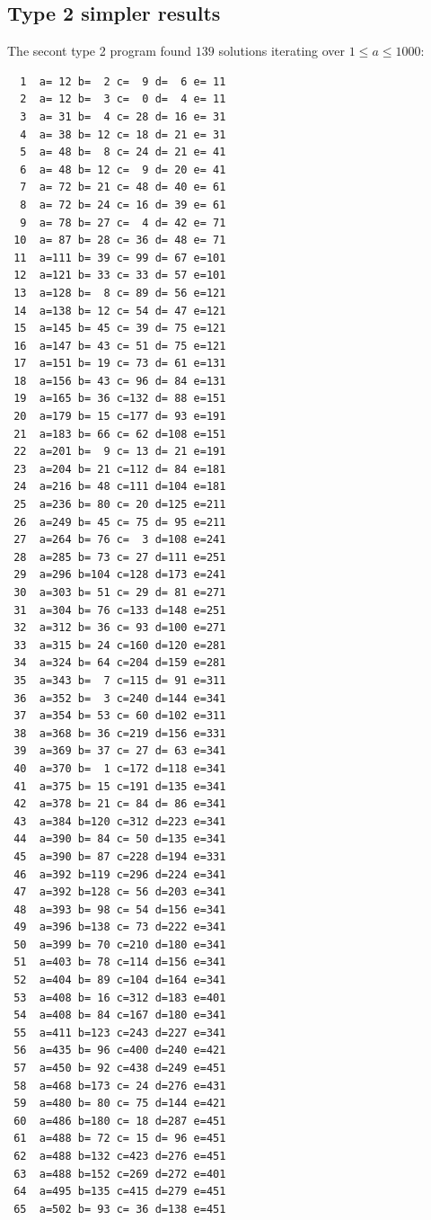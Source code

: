\documentclass[11pt]{article}
\begin{document}
\subsection{Type 2 simpler results}
The secont type 2 program found $139$ solutions iterating over $1 \leq a \leq 1000$: 
\begin{lstlisting}
  1  a= 12 b=  2 c=  9 d=  6 e= 11
  2  a= 12 b=  3 c=  0 d=  4 e= 11
  3  a= 31 b=  4 c= 28 d= 16 e= 31
  4  a= 38 b= 12 c= 18 d= 21 e= 31
  5  a= 48 b=  8 c= 24 d= 21 e= 41
  6  a= 48 b= 12 c=  9 d= 20 e= 41
  7  a= 72 b= 21 c= 48 d= 40 e= 61
  8  a= 72 b= 24 c= 16 d= 39 e= 61
  9  a= 78 b= 27 c=  4 d= 42 e= 71
 10  a= 87 b= 28 c= 36 d= 48 e= 71
 11  a=111 b= 39 c= 99 d= 67 e=101
 12  a=121 b= 33 c= 33 d= 57 e=101
 13  a=128 b=  8 c= 89 d= 56 e=121
 14  a=138 b= 12 c= 54 d= 47 e=121
 15  a=145 b= 45 c= 39 d= 75 e=121
 16  a=147 b= 43 c= 51 d= 75 e=121
 17  a=151 b= 19 c= 73 d= 61 e=131
 18  a=156 b= 43 c= 96 d= 84 e=131
 19  a=165 b= 36 c=132 d= 88 e=151
 20  a=179 b= 15 c=177 d= 93 e=191
 21  a=183 b= 66 c= 62 d=108 e=151
 22  a=201 b=  9 c= 13 d= 21 e=191
 23  a=204 b= 21 c=112 d= 84 e=181
 24  a=216 b= 48 c=111 d=104 e=181
 25  a=236 b= 80 c= 20 d=125 e=211
 26  a=249 b= 45 c= 75 d= 95 e=211
 27  a=264 b= 76 c=  3 d=108 e=241
 28  a=285 b= 73 c= 27 d=111 e=251
 29  a=296 b=104 c=128 d=173 e=241
 30  a=303 b= 51 c= 29 d= 81 e=271
 31  a=304 b= 76 c=133 d=148 e=251
 32  a=312 b= 36 c= 93 d=100 e=271
 33  a=315 b= 24 c=160 d=120 e=281
 34  a=324 b= 64 c=204 d=159 e=281
 35  a=343 b=  7 c=115 d= 91 e=311
 36  a=352 b=  3 c=240 d=144 e=341
 37  a=354 b= 53 c= 60 d=102 e=311
 38  a=368 b= 36 c=219 d=156 e=331
 39  a=369 b= 37 c= 27 d= 63 e=341
 40  a=370 b=  1 c=172 d=118 e=341
 41  a=375 b= 15 c=191 d=135 e=341
 42  a=378 b= 21 c= 84 d= 86 e=341
 43  a=384 b=120 c=312 d=223 e=341
 44  a=390 b= 84 c= 50 d=135 e=341
 45  a=390 b= 87 c=228 d=194 e=331
 46  a=392 b=119 c=296 d=224 e=341
 47  a=392 b=128 c= 56 d=203 e=341
 48  a=393 b= 98 c= 54 d=156 e=341
 49  a=396 b=138 c= 73 d=222 e=341
 50  a=399 b= 70 c=210 d=180 e=341
 51  a=403 b= 78 c=114 d=156 e=341
 52  a=404 b= 89 c=104 d=164 e=341
 53  a=408 b= 16 c=312 d=183 e=401
 54  a=408 b= 84 c=167 d=180 e=341
 55  a=411 b=123 c=243 d=227 e=341
 56  a=435 b= 96 c=400 d=240 e=421
 57  a=450 b= 92 c=438 d=249 e=451
 58  a=468 b=173 c= 24 d=276 e=431
 59  a=480 b= 80 c= 75 d=144 e=421
 60  a=486 b=180 c= 18 d=287 e=451
 61  a=488 b= 72 c= 15 d= 96 e=451
 62  a=488 b=132 c=423 d=276 e=451
 63  a=488 b=152 c=269 d=272 e=401
 64  a=495 b=135 c=415 d=279 e=451
 65  a=502 b= 93 c= 36 d=138 e=451

\end{lstlisting}
\end{document}

